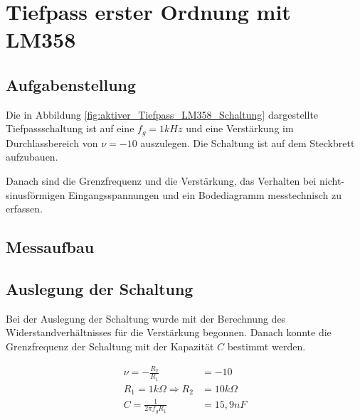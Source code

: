 \section{Tiefpass erster Ordnung mit LM358}
\subsection{Aufgabenstellung}
Die in Abbildung \ref{fig:aktiver_Tiefpass_LM358_Schaltung} dargestellte Tiefpassschaltung ist auf eine $f_g=1kHz$ und eine Verstärkung im Durchlassbereich von $\nu = -10$ auszulegen. Die Schaltung ist auf dem Steckbrett aufzubauen.

Danach sind die Grenzfrequenz und die Verstärkung, das Verhalten bei nicht-sinusförmigen Eingangsspannungen und ein Bodediagramm messtechnisch zu erfassen. 

\subsection{Messaufbau}

\subsection{Auslegung der Schaltung}
Bei der Auslegung der Schaltung wurde mit der Berechnung des Widerstandverhältnisses für die Verstärkung begonnen. Danach konnte die Grenzfrequenz der Schaltung mit der Kapazität $C$ bestimmt werden.

\begin{align}
    \nu = -\frac{R_2}{R_1} &= -10\\
    R_1 = 1k\Omega \Rightarrow R_2 &= 10k\Omega\\
    C = \frac{1}{2\pi f_g R_1} &= 15,9nF
\end{align}

